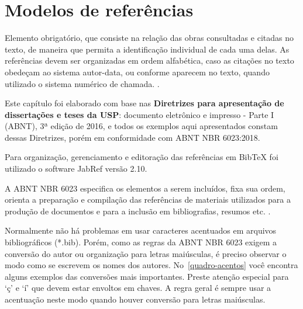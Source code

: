 

\chapter{Modelos de referências}
\label{Referências}
Elemento obrigatório, que consiste na relação das obras consultadas e citadas no texto, de maneira que permita a identificação individual de cada uma delas. As referências devem ser organizadas em ordem alfabética, caso as citações no texto obedeçam ao sistema autor-data, ou conforme aparecem no texto, quando utilizado o sistema numérico de chamada. \cite{sibi2016}.

Este capítulo foi elaborado com base nas \textbf{Diretrizes para apresentação de dissertações e teses da USP}: documento eletrônico e impresso - Parte I (ABNT), 3ª edição de 2016, e todos os exemplos aqui apresentados constam dessas Diretrizes, porém em conformidade com ABNT NBR 6023:2018. 

Para organização, gerenciamento e editoração das referências em BibTeX foi utilizado o software JabRef versão 2.10.

A ABNT NBR 6023 especifica os elementos a serem incluídos, fixa sua ordem, orienta a preparação e compilação das referências de materiais utilizados para a produção de documentos e para a inclusão em bibliografias, resumos etc. \cite{nbr6023a}.

Normalmente não há problemas em usar caracteres acentuados em arquivos bibliográficos {(*.bib)}. Porém, como as regras da ABNT NBR 6023 exigem a conversão do autor ou organização para letras maiúsculas, é preciso observar o modo como se escrevem os nomes dos autores. No~\autoref{quadro-acentos} você encontra alguns
exemplos das conversões mais importantes. Preste atenção especial para `ç' e `í'
que devem estar envoltos em chaves. A regra geral é sempre usar a acentuação neste modo quando houver conversão para letras maiúsculas. \cite{abnetxcite} \\

